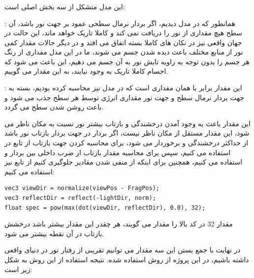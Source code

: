 \documentclass[a4paper, 12pt]{book}
\newcommand{\lrbold}[1]{\lr{\textbf{#1}}}
\newcommand{\lrit}[1]{\lr{\textit{#1}}}
\begin{document}
    \subsubsection*{}
        این مدل متشکل از سه بخش اصلی است:\par
    \lrbold{ambient}:
    همانطور که در مدل  دیدیم، اگر بردار نرمال سطحی عمود بر جهت نور باشد، آن سطح هیچ مقداری از نور را دریافت نمی کند و کاملا تاریک خواهد ماند، این حالت در جهان واقعی نیز در نکان های کاملا بسته اتفاق می افتد و در دیگر حالات مقدار کمی نور از منابع مختلف باعث دیده شدن جسم می شوند، ما در این مدل مقداری از رنگ هر جسم را بدون توجه به زاویه تابش نور به آن جسم می دهیم، این باعث می شود که اجسام کاملا تاریک به وجود نیایند، به این مقدار  می گوییم.\par
    
    \lrbold{diffuse}:
    این مقدار برابر با همان مقداری است که در مدل  نیز محاسبه کرده بودیم، بسته به جهت بردار نرمال سطح و جهت نور مقداری انرژی توسط هر سطح جذب می شود و باعث روشن شدن سطح می گردد.\par
    
    \lrbold{specular}
    این مقدار باعث به وجود آمدن درخشندگی و بازتاب بیشتر نور نسبت به مکان ناظر می شود، این مقدار مستقل از مکان ناظر نیست، اگر بردار  در جهت بردار بازتاب نور باشد از حداکثر درخشندگی و  برخوردار می شود، برای محاسبه کردن جهت بازتاب از تابع  در  استفاده می کنیم، سپس برای محاسبه مقدار بازتاب از ضرب داخلی بین بردار  و  استفاده می کنیم، همچنین برای اینکه از منفی شدن مقادیر جلوگیری کنیم از تابع  نیز استفاده می کنیم:
    

    \begin{LTR}
    \small
        \begin{lstlisting}[style=C++Style,caption=\lrit{calculating specular component}]
vec3 viewDir = normalize(viewPos - FragPos);
vec3 reflectDir = reflect(-lightDir, norm);
float spec = pow(max(dot(viewDir, reflectDir), 0.0), 32);
        \end{lstlisting}
    \end{LTR}
    \normalsize
    \vspace*{0.3cm}
    
    مقدار 32 در کد بالا را مقدار  می گویند، هر چقدر این مقدار بیشتر باشد درخشش بازتاب در آن نقطه بیشتر می شود.\par
    در نهایت با جمع بستن این سه مقدار می توانیم تقریبی از رفتار نور در دنیای واقعی داشته باشیم، در این پروژه از روش  استفاده شده.
    نتیجه استفاده از این روش به شکل زیر است:
    
\end{document}
